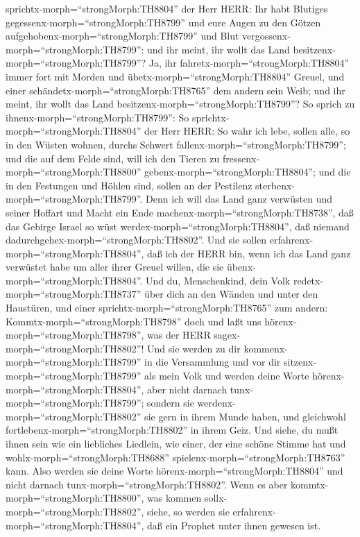 sprichtx-morph=``strongMorph:TH8804'' der Herr HERR: Ihr habt Blutiges
gegessenx-morph=``strongMorph:TH8799'' und eure Augen zu den Götzen
aufgehobenx-morph=``strongMorph:TH8799'' und Blut
vergossenx-morph=``strongMorph:TH8799'': und ihr meint, ihr wollt das
Land besitzenx-morph=``strongMorph:TH8799''?  Ja, ihr
fahretx-morph=``strongMorph:TH8804'' immer fort mit Morden und
übetx-morph=``strongMorph:TH8804'' Greuel, und einer
schändetx-morph=``strongMorph:TH8765'' dem andern sein Weib; und ihr
meint, ihr wollt das Land besitzenx-morph=``strongMorph:TH8799''?
 So sprich zu ihnenx-morph=``strongMorph:TH8799'': So
sprichtx-morph=``strongMorph:TH8804'' der Herr HERR: So wahr ich lebe,
sollen alle, so in den Wüsten wohnen, durchs Schwert
fallenx-morph=``strongMorph:TH8799''; und die auf dem Felde sind, will
ich den Tieren zu fressenx-morph=``strongMorph:TH8800''
gebenx-morph=``strongMorph:TH8804''; und die in den Festungen und Höhlen
sind, sollen an der Pestilenz sterbenx-morph=``strongMorph:TH8799''.
 Denn ich will das Land ganz verwüsten und seiner Hoffart
und Macht ein Ende machenx-morph=``strongMorph:TH8738'', daß das Gebirge
Israel so wüst werdex-morph=``strongMorph:TH8804'', daß niemand
dadurchgehex-morph=``strongMorph:TH8802''.  Und sie sollen
erfahrenx-morph=``strongMorph:TH8804'', daß ich der HERR bin, wenn ich
das Land ganz verwüstet habe um aller ihrer Greuel willen, die sie
übenx-morph=``strongMorph:TH8804''.  Und du, Menschenkind,
dein Volk redetx-morph=``strongMorph:TH8737'' über dich an den Wänden
und unter den Haustüren, und einer sprichtx-morph=``strongMorph:TH8765''
zum andern: Kommtx-morph=``strongMorph:TH8798'' doch und laßt uns
hörenx-morph=``strongMorph:TH8798'', was der HERR
sagex-morph=``strongMorph:TH8802''!  Und sie werden zu dir
kommenx-morph=``strongMorph:TH8799'' in die Versammlung und vor dir
sitzenx-morph=``strongMorph:TH8799'' als mein Volk und werden deine
Worte hörenx-morph=``strongMorph:TH8804'', aber nicht darnach
tunx-morph=``strongMorph:TH8799''; sondern sie
werdenx-morph=``strongMorph:TH8802'' sie gern in ihrem Munde haben, und
gleichwohl fortlebenx-morph=``strongMorph:TH8802'' in ihrem Geiz.
 Und siehe, du mußt ihnen sein wie ein liebliches Liedlein,
wie einer, der eine schöne Stimme hat und
wohlx-morph=``strongMorph:TH8688'' spielenx-morph=``strongMorph:TH8763''
kann. Also werden sie deine Worte hörenx-morph=``strongMorph:TH8804''
und nicht darnach tunx-morph=``strongMorph:TH8802''.  Wenn
es aber kommtx-morph=``strongMorph:TH8800'', was kommen
sollx-morph=``strongMorph:TH8802'', siehe, so werden sie
erfahrenx-morph=``strongMorph:TH8804'', daß ein Prophet unter ihnen
gewesen ist.

